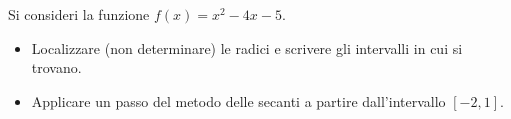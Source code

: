 Si consideri la funzione $f(x)=x^2-4x-5$.
\begin{itemize}
\item Localizzare (non determinare) le radici e
scrivere gli intervalli in cui si trovano.
\item Applicare un passo del metodo delle secanti a partire dall'intervallo
$[-2,1]$.
\end{itemize}
